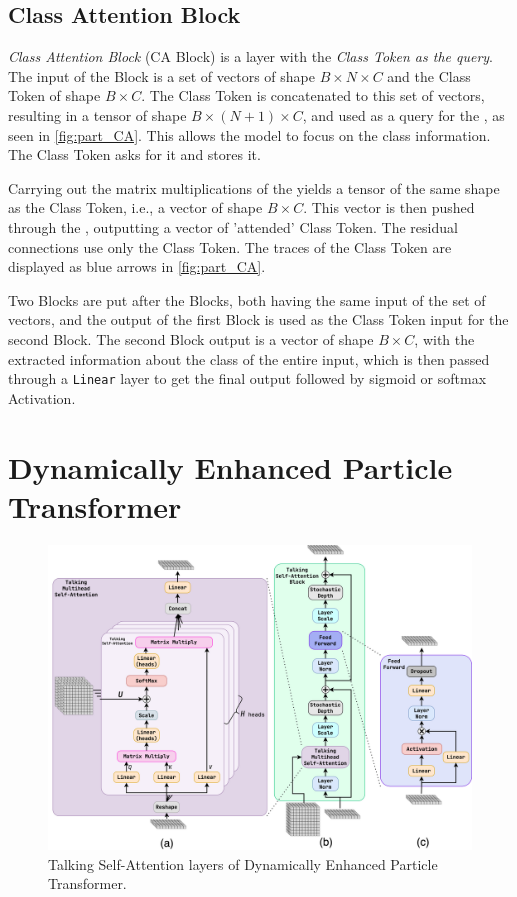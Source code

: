 \subsection{Class Attention Block}
\label{sec:CA}
\emph{Class Attention Block} (CA Block) is a \MHA layer with the \emph{Class Token as the query}.
The input of the \CA Block is a set of vectors of shape $B \times N \times C$ and the Class Token of shape $B \times C$. 
The Class Token is concatenated to this set of vectors, resulting in a tensor of shape $B \times (N+1) \times C$, and used as a query for the \MHA, as seen in \cref{fig:part_CA}.
This allows the model to focus on the class information. 
The Class Token asks for it and stores it.

Carrying out the matrix multiplications of the \MHA yields a tensor of the same shape as the Class Token, i.e., a vector of shape $B \times C$.
This vector is then pushed through the \FFN, outputting a vector of 'attended' Class Token.
The residual connections use only the Class Token.
The traces of the Class Token are displayed as blue arrows in \cref{fig:part_CA}.

Two \CA Blocks are put after the \SA Blocks, both having the same input of the set of vectors, and the output of the first \CA Block is used as the Class Token input for the second \CA Block.
The second \CA Block output is a vector of shape $B \times C$, with the extracted information about the class of the entire input, which is then passed through a \texttt{Linear} layer to get the final output followed by sigmoid or softmax Activation.



\section{Dynamically Enhanced Particle Transformer}
\label{sec:depart}

\begin{figure}[htb]
    \centering
    \includegraphics[width=1\linewidth]{src/diagrams/depart_layers.png}
    \caption{Talking Self-Attention layers of Dynamically Enhanced Particle Transformer.}
    \label{fig:depart_SA}
\end{figure}


